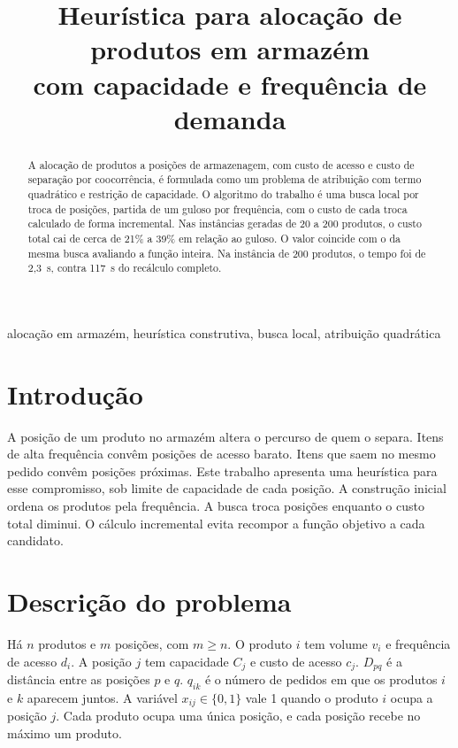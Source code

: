 \documentclass[conference,a4paper]{IEEEtran}
\begin{document}
\title{Heurística para alocação de produtos em armazém\\
com capacidade e frequência de demanda}

\author{
}

\maketitle

\begin{abstract}
A alocação de produtos a posições de armazenagem, com custo de acesso e custo de separação por coocorrência, é formulada como um problema de atribuição com termo quadrático e restrição de capacidade.
O algoritmo do trabalho é uma busca local por troca de posições, partida de um guloso por frequência, com o custo de cada troca calculado de forma incremental.
Nas instâncias geradas de 20 a 200 produtos, o custo total cai de cerca de 21\% a 39\% em relação ao guloso.
O valor coincide com o da mesma busca avaliando a função inteira.
Na instância de 200 produtos, o tempo foi de 2,3~s, contra 117~s do recálculo completo.
\end{abstract}

\begin{IEEEkeywords}
alocação em armazém, heurística construtiva, busca local, atribuição quadrática
\end{IEEEkeywords}

\section{Introdução}
A posição de um produto no armazém altera o percurso de quem o separa.
Itens de alta frequência convêm posições de acesso barato.
Itens que saem no mesmo pedido convêm posições próximas.
Este trabalho apresenta uma heurística para esse compromisso, sob limite de capacidade de cada posição.
A construção inicial ordena os produtos pela frequência.
A busca troca posições enquanto o custo total diminui.
O cálculo incremental evita recompor a função objetivo a cada candidato.

\section{Descrição do problema}
Há \(n\) produtos e \(m\) posições, com \(m \ge n\).
O produto \(i\) tem volume \(v_i\) e frequência de acesso \(d_i\).
A posição \(j\) tem capacidade \(C_j\) e custo de acesso \(c_j\).
\(D_{pq}\) é a distância entre as posições \(p\) e \(q\).
\(q_{ik}\) é o número de pedidos em que os produtos \(i\) e \(k\) aparecem juntos.
A variável \(x_{ij} \in \{0,1\}\) vale 1 quando o produto \(i\) ocupa a posição \(j\).
Cada produto ocupa uma única posição, e cada posição recebe no máximo um produto.
\end{document}
